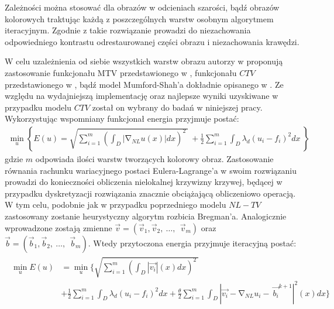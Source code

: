 \documentclass[12pt, twoside, openany]{report}
\theoremstyle{definition}
\begin{document}
Zależności można stosować dla obrazów w odcieniach szarości, bądź obrazów kolorowych traktując każdą z poszczególnych warstw osobnym algorytmem iteracyjnym. Zgodnie z \cite{duan2015fast} takie rozwiązanie prowadzi do niezachowania odpowiedniego kontrastu odrestaurowanej części obrazu i niezachowania krawędzi.
\par
W celu uzależnienia od siebie wszystkich warstw obrazu autorzy w \cite{duan2015fast} proponują zastosowanie funkcjonału MTV przedstawionego w \cite{yang2009fast}, funkcjonału $CTV$ przedstawionego w \cite{blomgren1998color}, bądź model Mumford-Shah’a dokładnie opisanego w \cite{jung2011nonlocal}. Ze względu na wydajniejszą implementację oraz najlepsze wyniki uzyskiwane w przypadku modelu $CTV$ został on wybrany do badań w niniejszej pracy. Wykorzystując wspomniany funkcjonał energia przyjmuje postać:
\begin{align}
{\mathop{\mathrm{min}}_{u} \left\{E\left(u\right)=\sqrt{\sum^m_{i=1}{{\left(\int_D{\left|{\mathrm{\nabla }}_{NL}u(x)\right|}dx\right)}^2}\ }\ +\frac{1}{2}\sum^m_{i=1}{\int_D{{\lambda }_d{\left(u_i-f_i\right)}^2}dx}\ \right\}\ }
\label{ENLCTV}
\end{align}
gdzie $m$ odpowiada ilości warstw tworzących kolorowy obraz. Zastosowanie równania rachunku wariacyjnego postaci Eulera-Lagrange’a w swoim rozwiązaniu prowadzi do konieczności obliczenia nielokalnej krzywizny krzywej, będącej w przypadku dyskretyzacji rozwiązania znacznie obciążającą obliczeniowo operacją. W tym celu, podobnie jak w przypadku poprzedniego modelu $NL-TV$ zastosowany zostanie heurystyczny algorytm rozbicia Bregman’a. Analogicznie wprowadzone zostają zmienne $\overrightarrow{v}=\left({\overrightarrow{v}}_1,{\overrightarrow{v}}_2,\ \dots ,\ \ {\overrightarrow{v}}_m\right)$ oraz $\overrightarrow{b}=\left({\overrightarrow{b}}_1,{\overrightarrow{b}}_2,\ \dots ,\ \ {\overrightarrow{b}}_m\right)$. Wtedy przytoczona energia przyjmuje iteracyjną postać: 
\begin{align}
\begin{aligned}
\mathop{\mathrm{min}}_{u}E\left(u\right) &= \mathop{\mathrm{min}}_{u}\Biggl\{\sqrt{\sum^m_{i=1}{{\left(\int_D{\left|\overrightarrow{v_i}\right|(x)}dx\right)}^2}\ }\\ 
&+\frac{1}{2}\sum^m_{i=1}{\int_D{{\lambda }_d{\left(u_i-f_i\right)}^2}dx} 
+\frac{\theta }{2}\sum^m_{i=1}{\int_D{{\left|\overrightarrow{v_i}-{\mathrm{\nabla }}_{NL}u_i-\ {\overrightarrow{b_i}}^{k+1}\right|}^2\left(x\right)}dx}\Biggr\}
\end{aligned}
\label{ENLCTV1}
\end{align}
\end{document}
